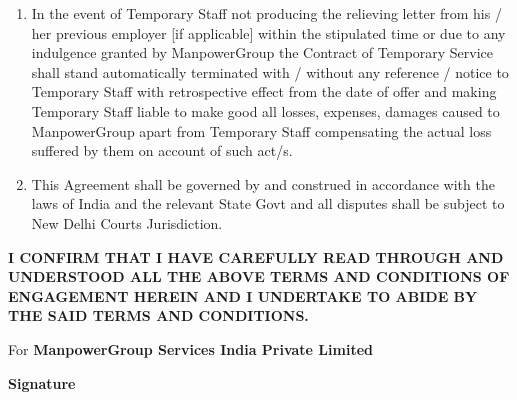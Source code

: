 \documentclass[10pt,a4paper]{article}
\begin{document}
\begin{enumerate}[leftmargin=*, label=\textbf{\arabic*.}, itemsep=4pt, start=16]

\item In the event of Temporary Staff not producing the relieving letter from his / her previous employer [if
applicable] within the stipulated time or due to any indulgence granted by ManpowerGroup the
Contract of Temporary Service shall stand automatically terminated with / without any reference /
notice to Temporary Staff with retrospective effect from the date of offer and making Temporary
Staff liable to make good all losses, expenses, damages caused to ManpowerGroup apart from
Temporary Staff compensating the actual loss suffered by them on account of such act/s.

\item This Agreement shall be governed by and construed in accordance with the laws of India and the
relevant State Govt and all disputes shall be subject to New Delhi Courts Jurisdiction.

\end{enumerate}

\vspace{0.5cm}

\noindent\textbf{I CONFIRM THAT I HAVE CAREFULLY READ THROUGH AND UNDERSTOOD ALL THE ABOVE TERMS AND
CONDITIONS OF ENGAGEMENT HEREIN AND I UNDERTAKE TO ABIDE BY THE SAID TERMS AND
CONDITIONS.}

\vspace{0.8cm}


\noindent
\begin{minipage}[t]{0.55\textwidth}
  \vspace{0pt}
  For \textbf{ManpowerGroup Services India Private Limited}
\end{minipage}%
\hfill
\begin{minipage}[t]{0.38\textwidth}
  \raggedleft\vspace{0pt}
  \textbf{Signature}
\end{minipage}

\vspace{0.5cm}
\end{document}
